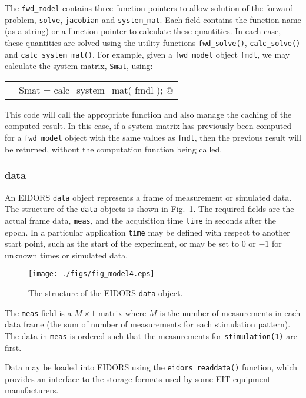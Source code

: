 \documentclass[12pt]{iopart}
\makeatletter
\newcommand{\CODEstart}{\medskip\begin{tabular}{ll}}
\newcommand{\CN}{\tt\scriptsize} %
\newcommand{\CC}{&\small\verb@}   % start code
\newcommand{\CODEend}{\end{tabular}\medskip}
\makeatother
\begin{document}
The {\tt fwd\_model} contains three function pointers
to allow solution of the forward problem,
{\tt solve},
{\tt jacobian} and
{\tt system\_mat}. Each field contains the function
name (as a string) or a function pointer to calculate
these quantities. In each case, these quantities
are solved using the utility functions 
{\tt fwd\_solve()}, 
{\tt calc\_solve()} and
{\tt calc\_system\_mat()}.
For example, given
a {\tt fwd\_model} object {\tt fmdl}, we may calculate
the system matrix, {\tt Smat}, using:

\CODEstart
\CN    \CC Smat = calc_system_mat( fmdl ); @\\[-3pt]
\CODEend

This code will
call the appropriate function and also manage
the caching of the computed result. In this case, if a
system matrix has previously been computed for
a {\tt fwd\_model} object with the same values
as {\tt fmdl}, then the previous result will be
returned, without the computation function being
called.


\subsubsection{data}

An EIDORS {\tt data} object represents a frame of
measurement or simulated data. The structure of the
{\tt data} objects is shown in Fig.~\ref{fig:data}. The
required fields are the actual frame data, {\tt meas},
and the acquisition time {\tt time} in seconds 
after the epoch. In a particular application {\tt time}
may be defined with respect to another start point, such as
the start of the experiment, or may be set to $0$ or $-1$ 
for unknown times or simulated data.

%
%
\begin{figure}[th]
\begin{flushright}
\texttt{[image: ./figs/fig\_model4.eps]}
\caption{\small The structure of the EIDORS {\tt data} object.
\label{fig:data}
 }
\end{flushright}
\end{figure}


The {\tt meas} field is a $M\times1$ matrix where
$M$ is the number of measurements in each data frame
(the sum of number of measurements for each stimulation
pattern). The data in {\tt meas} is ordered such that
the measurements for {\tt stimulation(1)} are first.

Data may be loaded into EIDORS using the {\tt eidors\_readdata()}
function, which provides an interface to the storage
formats used by some EIT equipment manufacturers.
\end{document}
